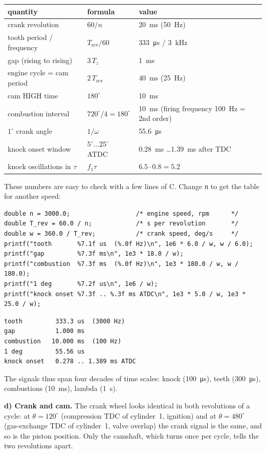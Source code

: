 \begin{solution}
\begin{center}
\small
\begin{tabular}{@{}lll@{}}
\toprule
quantity & formula & value \\
\midrule
crank revolution & $60/n$ & \SI{20}{ms} (\SI{50}{Hz}) \\
tooth period / frequency & $T_{\text{rev}}/60$ & \SI{333}{\micro s} / \SI{3}{kHz} \\
gap (rising to rising) & $3\,T_z$ & \SI{1}{ms} \\
engine cycle = cam period & $2\,T_{\text{rev}}$ & \SI{40}{ms} (\SI{25}{Hz}) \\
cam HIGH time & $180^\circ$ & \SI{10}{ms} \\
combustion interval & $720^\circ/4 = 180^\circ$ & \SI{10}{ms} (firing frequency \SI{100}{Hz} = 2nd order) \\
$1^\circ$ crank angle & $1/\omega$ & \SI{55.6}{\micro s} \\
knock onset window & $5^\circ\dots25^\circ$ ATDC & \SI{0.28}{ms} \dots \SI{1.39}{ms} after TDC \\
knock oscillations in $\tau$ & $f_1\tau$ & $6.5\cdot 0.8 = 5.2$ \\
\bottomrule
\end{tabular}
\end{center}
These numbers are easy to check with a few lines of C. Change \texttt{n} to
get the table for another speed:
\begin{lstlisting}
double n = 3000.0;                  /* engine speed, rpm      */
double T_rev = 60.0 / n;            /* s per revolution       */
double w = 360.0 / T_rev;           /* crank speed, deg/s     */
printf("tooth       %7.1f us  (%.0f Hz)\n", 1e6 * 6.0 / w, w / 6.0);
printf("gap         %7.3f ms\n", 1e3 * 18.0 / w);
printf("combustion  %7.3f ms  (%.0f Hz)\n", 1e3 * 180.0 / w, w / 180.0);
printf("1 deg       %7.2f us\n", 1e6 / w);
printf("knock onset %7.3f .. %.3f ms ATDC\n", 1e3 * 5.0 / w, 1e3 * 25.0 / w);
\end{lstlisting}
\begin{lstlisting}[style=shell,numbers=none]
tooth         333.3 us  (3000 Hz)
gap           1.000 ms
combustion   10.000 ms  (100 Hz)
1 deg         55.56 us
knock onset   0.278 .. 1.389 ms ATDC
\end{lstlisting}
The signals thus span four decades of time scales: knock (\SI{100}{\micro s}),
teeth (\SI{300}{\micro s}), combustions (\SI{10}{ms}), lambda (\SI{1}{s}).

\textbf{d) Crank and cam.}
The crank wheel looks identical in both revolutions of a cycle: at
$\theta=120^\circ$ (compression TDC of cylinder~1, ignition) and at
$\theta=480^\circ$ (gas-exchange TDC of cylinder~1, valve overlap) the crank
signal is the same, and so is the piston position. Only the camshaft, which
turns once per cycle, tells the two revolutions apart.


\end{solution}
